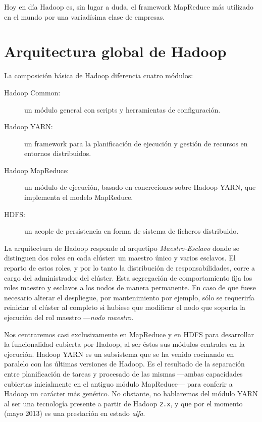 Hoy en d\'ia Hadoop es, sin lugar a duda, el framework MapReduce m\'as utilizado en el mundo por una variad\'isima clase de empresas.


\section{Arquitectura global de Hadoop}\label{sec:arquitecturahadoop}
\noindent La composici\'on b\'asica de Hadoop diferencia cuatro m\'odulos:
\begin{description}
 \item[Hadoop Common:] un m\'odulo general con scripts y herramientas de configuraci\'on.
 \item[Hadoop YARN:] un framework para la planificaci\'on de ejecuci\'on y gesti\'on de recursos en entornos distribuidos.
 \item[Hadoop MapReduce:] un m\'odulo de ejecuci\'on, basado en concreciones sobre Hadoop YARN, que implementa el modelo MapReduce.
 \item[HDFS:] un acople de persistencia en forma de sistema de ficheros distribuido.
\end{description}

La arquitectura de Hadoop responde al arquetipo \emph{Maestro-Esclavo} donde se distinguen dos roles en cada cl\'uster: un maestro \'unico y varios esclavos. El reparto de estos roles, y por lo tanto la distribuci\'on de responsabilidades, corre a cargo del administrador del cl\'uster. Esta segregaci\'on de comportamiento fija los roles maestro y esclavos a los nodos de manera permanente. En caso de que fuese necesario alterar el despliegue, por mantenimiento por ejemplo, s\'olo se requerir\'ia reiniciar el cl\'uster al completo si hubiese que mo\-di\-fi\-car el nodo que soporta la ejecuci\'on del rol maestro ---\emph{nodo maestro}.\newline

Nos centraremos casi exclusivamente en MapReduce y en HDFS para desarrollar la funcionalidad cubierta por Hadoop, al ser \'estos sus m\'odulos centrales en la ejecuci\'on. Hadoop YARN es un subsistema que se ha venido cocinando en paralelo con las \'ultimas versiones de Hadoop. Es el resultado de la separaci\'on entre planificaci\'on de tareas y procesado de las mismas ---ambas capacidades cubiertas inicialmente en el antiguo m\'odulo MapReduce--- para conferir a Hadoop un car\'acter m\'as gen\'erico. No obstante, no hablaremos del m\'odulo YARN al ser una tecnolog\'ia presente a partir de Hadoop \texttt{2.x}, y que por el momento (mayo 2013) es una prestaci\'on en estado \emph{alfa}. \newline

